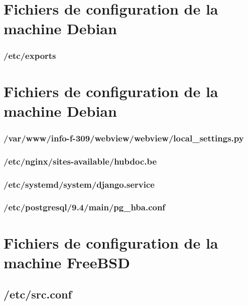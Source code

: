 \documentclass[10pt,a4paper]{article}
\begin{document}
\newpage
\begin{appendices}
  \section{Fichiers de configuration de la machine Debian}
  \subsubsection{/etc/exports}
  \label{subs:etc-exports}
  

  \section{Fichiers de configuration de la machine Debian}
  \subsubsection{/var/www/info-f-309/webview/webview/local\_settings.py}
  \label{subs:deb-webview-local-settings}
  

  \subsubsection{/etc/nginx/sites-available/hubdoc.be}
  \label{subs:deb-nginx-sites-avail-hubdoc}
  

  \subsubsection{/etc/systemd/system/django.service}
  \label{subs:deb-django-service}
  

  \subsubsection{/etc/postgresql/9.4/main/pg\_hba.conf}
  \label{subs:deb-pg-hba}
  

  \section{Fichiers de configuration de la machine FreeBSD}

  \subsection{/etc/src.conf}
  \label{sub:etc-src-conf}
  


\end{appendices}
\end{document}
